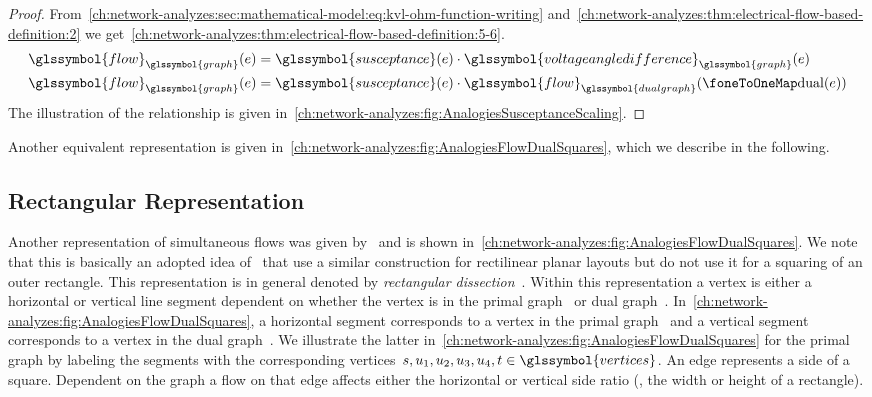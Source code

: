 \begin{proof}
    From~\cref{ch:network-analyzes:sec:mathematical-model:eq:kvl-ohm-function-writing}
    and~\cref{ch:network-analyzes:thm:electrical-flow-based-definition:2} we
    get~\cref{ch:network-analyzes:thm:electrical-flow-based-definition:5-6}.
    \begin{subequations}
    \begin{align}
        \glssymbol{flow}_{\glssymbol{graph}}(\edge) 
        &= 
        \glssymbol{susceptance}(\edge)\cdot
        \glssymbol{voltageangledifference}_{\glssymbol{graph}}(\edge)
        \label{ch:network-analyzes:thm:electrical-flow-based-definition:5}
        \\
        \glssymbol{flow}_{\glssymbol{graph}}(\edge) 
        &= 
        \glssymbol{susceptance}(\edge)\cdot
        \glssymbol{flow}_{\glssymbol{dualgraph}}(\oneToOneMap(\edge)) 
        \label{ch:network-analyzes:thm:electrical-flow-based-definition:6}
    \end{align}
    \label{ch:network-analyzes:thm:electrical-flow-based-definition:5-6}
    \end{subequations}
    The illustration of the relationship is given
    in~\cref{ch:network-analyzes:fig:AnalogiesSusceptanceScaling}.
\end{proof}
% 
Another equivalent representation is given
in~\cref{ch:network-analyzes:fig:AnalogiesFlowDualSquares}, which we
describe in the following.
% 
\subsection{Rectangular Representation}
\label{ch:network-analyzes:rectangular-representation}
% 
Another representation of simultaneous flows was given by~\textcite[p.18]{Fel13}
and is shown
in~\cref{ch:network-analyzes:fig:AnalogiesFlowDualSquares}. We note
that this is basically an adopted idea of~\textcite{Ros86} that use a similar
construction for rectilinear planar layouts but do not use it for a squaring of
an outer rectangle.
% 
This representation is in general denoted by \emph{rectangular
dissection}~\rectangulardissection. Within this representation a vertex is
either a horizontal or vertical line segment dependent on whether the vertex is
in the primal graph~ or dual graph~.
In~\cref{ch:network-analyzes:fig:AnalogiesFlowDualSquares}, a
horizontal segment corresponds to a vertex in the primal graph~
and a vertical segment corresponds to a vertex in the dual
graph~. We illustrate the latter
in~\cref{ch:network-analyzes:fig:AnalogiesFlowDualSquares} for the
primal graph by labeling the segments with the corresponding
vertices~$\source,\vertexa_1,\vertexa_2,\vertexa_3,\vertexa_4,\sink\in
\glssymbol{vertices}$. An edge represents a side of a square. Dependent on the
graph a flow on that edge affects either the horizontal or vertical side ratio
(\ie, the width or height of a rectangle).

